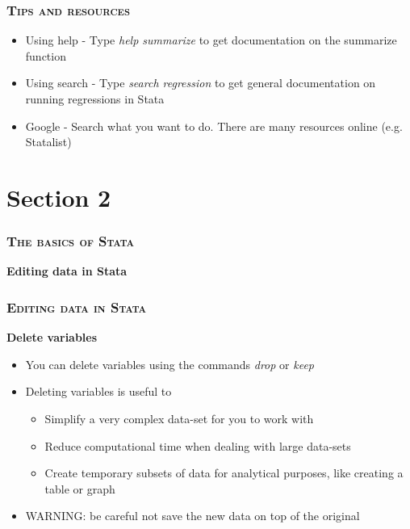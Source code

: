 \documentclass[10pt]{beamer}
\begin{document}
	\begin{frame}
		\frametitle{\textsc{Tips and resources}}
		\begin{itemize}
			\item Using help - Type \textit{help summarize} to get documentation on the summarize function
			\item Using search - Type \textit{search regression} to get general documentation on running regressions in Stata
			\item Google - Search what you want to do. There are many resources online (e.g. Statalist)
			
		\end{itemize}
	\end{frame}
		
\section{Section 2}

	\begin{frame}
		\frametitle{\textsc{The basics of Stata}}
		\begin{center}
			\textbf{Editing data in Stata}
		\end{center}
	\end{frame}

	\begin{frame}
		\frametitle{\textsc{Editing data in Stata}}
		\begin{center}
		\Large\textbf{Delete variables}
		\end{center}
		\begin{itemize}
			\item You can delete variables using the commands \textit{drop} or \textit{keep}
			\item Deleting variables is useful to
			\begin{itemize}
				\item Simplify a very complex data-set for you to work with	
				\item Reduce computational time when dealing with large data-sets
				\item Create temporary subsets of data for analytical purposes, like creating a table or graph
			\end{itemize}
			\item WARNING: be careful not save the new data on top of the original
		\end{itemize}
	\end{frame}
\end{document}
